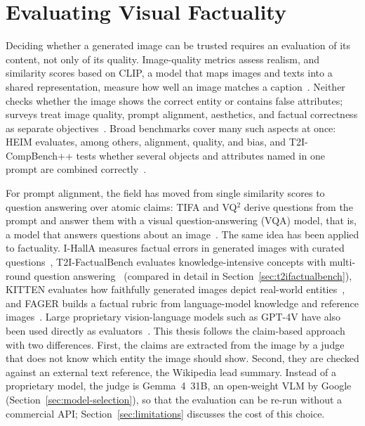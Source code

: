 \section{Evaluating Visual Factuality}
\label{sec:eval-factuality}

Deciding whether a generated image can be trusted requires an evaluation of
its content, not only of its quality. Image-quality metrics assess realism,
and similarity scores based on CLIP, a model that maps images and texts into a
shared representation, measure how
well an image matches a caption~\citep{radford2021,hessel2021}. Neither checks
whether the image shows the correct entity or contains false attributes;
surveys treat image quality, prompt alignment, aesthetics, and factual
correctness as separate objectives~\citep{hartwig2024}. Broad benchmarks cover
many such aspects at once: HEIM evaluates, among others, alignment, quality,
and bias, and T2I-CompBench++ tests whether several objects and attributes
named in one prompt are combined correctly~\citep{heim2024,t2icompbenchpp2024}.


For prompt alignment, the field has moved from single similarity scores to
question answering over atomic claims: TIFA and VQ$^2$ derive questions from the
prompt and answer them with a visual question-answering (VQA) model, that is,
a model that answers questions about an image~\citep{tifa2023,vq2}. The same idea has been applied to factuality.
I-HallA measures factual errors in generated images with curated
questions~\citep{ihalla2024}, T2I-FactualBench evaluates knowledge-intensive
concepts with multi-round question answering~\citep{t2ifactualbench2025}
(compared in detail in Section~\ref{sec:t2ifactualbench}),
KITTEN evaluates how faithfully generated images depict real-world
entities~\citep{kitten2024}, and FAGER builds a factual rubric from language-model
knowledge and reference images~\citep{fager2026}. Large proprietary
vision-language models such as GPT-4V have also been used directly as
evaluators~\citep{gpt4v2024}. This thesis follows the claim-based approach with
two differences. First, the claims are extracted from the image by a judge that
does not know which entity the image should show. Second, they are checked
against an external text reference, the Wikipedia lead summary. Instead of a
proprietary model, the judge is Gemma~4~31B, an open-weight VLM by Google
(Section~\ref{sec:model-selection}), so that the evaluation can be re-run
without a commercial API; Section~\ref{sec:limitations} discusses the cost of
this choice.


